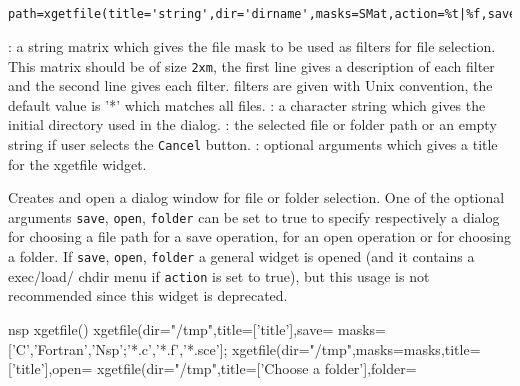 
\begin{mandesc}
  \\ %
\end{mandesc}
\label{xgetfile}
\begin{calling_sequence}
  \begin{verbatim}
    path=xgetfile(title='string',dir='dirname',masks=SMat,action=%t|%f,save=%t|%,open=%t|%f,folder=%t|%f)
  \end{verbatim}
\end{calling_sequence}
\begin{parameters}
  \begin{varlist}
    : a string matrix which gives the file mask to be used as filters for file selection. This matrix should be of size \verb+2xm+, the first line 
gives a description of each filter and the second line gives each filter. 
filters are given with Unix convention, the default value is '*' which matches all files.
    : a character string which gives the initial directory used in the dialog. 
    : the selected file or folder path or an empty string if user selects the \verb+Cancel+ 
    button.
    : optional arguments which gives a title for the xgetfile widget.
  \end{varlist}
\end{parameters}
\begin{mandescription}
  Creates and open a dialog window for file or folder selection. One of the optional arguments 
  \verb+save+, \verb+open+, \verb+folder+ can be set to true to specify respectively a dialog 
  for choosing a file path for a save operation, for an open operation or for choosing a folder. 
  If \verb+save+, \verb+open+, \verb+folder+ a general widget is opened (and it contains a exec/load/
  chdir menu if \verb+action+ is set to true), but this usage is not recommended since this 
  widget is deprecated.
\end{mandescription}
\begin{examples}
  \begin{mintednsp}{nsp} 
    xgetfile()
    xgetfile(dir="/tmp",title=['title'],save=%
    masks=['C','Fortran','Nsp';'*.c','*.f','*.sce'];
    xgetfile(dir="/tmp",masks=masks,title=['title'],open=%
    xgetfile(dir="/tmp",title=['Choose a folder'],folder=%
  \end{mintednsp} 
\end{examples}


